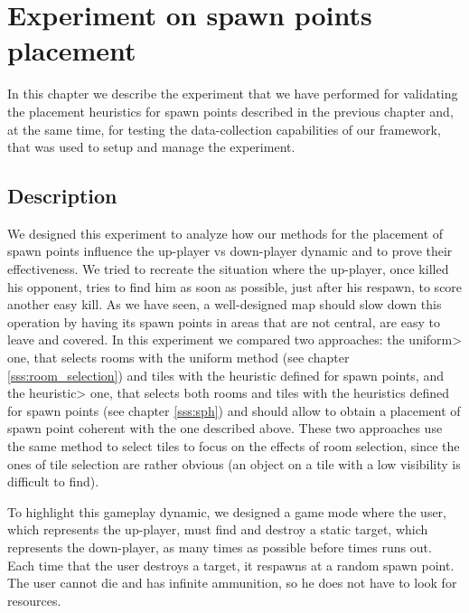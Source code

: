 \chapter{Experiment on spawn points placement}


In this chapter we describe the experiment that we have performed for validating the placement heuristics for spawn points described in the previous chapter and, at the same time, for testing the data-collection capabilities of our framework, that was used to setup and manage the experiment.


\section{Description}

We designed this experiment to analyze how our methods for the placement of spawn points influence the up-player vs down-player dynamic and to prove their effectiveness. We tried to recreate the situation where the up-player, once killed his opponent, tries to find him as soon as possible, just after his respawn, to score another easy kill. As we have seen, a well-designed map should slow down this operation by having its spawn points in areas that are not central, are easy to leave and covered. In this experiment we compared two approaches: the \<uniform> one, that selects rooms with the uniform method (see chapter \ref{sss:room_selection}) and tiles with the heuristic defined for spawn points, and the \<heuristic> one, that selects both rooms and tiles with the heuristics defined for spawn points (see chapter \ref{sss:sph}) and should allow to obtain a placement of spawn point coherent with the one described above. These two approaches use the same method to select tiles to focus on the effects of room selection, since the ones of tile selection are rather obvious (an object on a tile with a low visibility is difficult to find).

\par

To highlight this gameplay dynamic, we designed a game mode where the user, which represents the up-player, must find and destroy a static target, which represents the down-player, as many times as possible before times runs out. Each time that the user destroys a target, it respawns at a random spawn point. The user cannot die and has infinite ammunition, so he does not have to look for resources.

